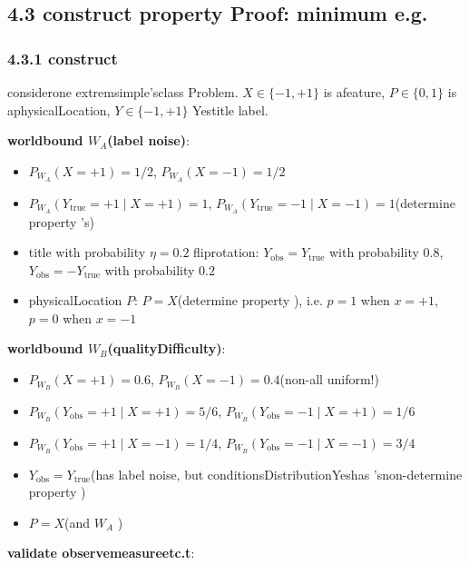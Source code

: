 \documentclass[
  12pt,
]{article}
\providecommand{\tightlist}{%
  \setlength{\itemsep}{0pt}\setlength{\parskip}{0pt}}
\begin{document}
\subsection{4.3
construct property Proof: minimum e.g.}\label{ux6784ux9020ux6027ux8bc1ux660eux6700ux5c0fux793aux4f8b}

\subsubsection{4.3.1 construct }\label{ux6784ux9020}

 considerone extremsimple'sclass Problem.  \(X \in \{-1, +1\}\)
is afeature, \(P \in \{0, 1\}\)
is aphysicalLocation, \(Y \in \{-1, +1\}\) Yestitle label. 

\textbf{worldbound  \(W_A\)(label noise)}: 

\begin{itemize}
\tightlist
\item
  \(P_{W_A}(X = +1) = 1/2\), \(P_{W_A}(X = -1) = 1/2\)
\item
  \(P_{W_A}(Y_{\text{true}} = +1 \mid X = +1) = 1\),
  \(P_{W_A}(Y_{\text{true}} = -1 \mid X = -1) = 1\)(determine property 's)
\item
  title with probability \(\eta = 0.2\) fliprotation: \(Y_{\text{obs}} = Y_{\text{true}}\)
  with probability \(0.8\), \(Y_{\text{obs}} = -Y_{\text{true}}\) with probability \(0.2\)
\item
  physicalLocation \(P\): \(P = X\)(determine property ), i.e. \(p = 1\) when 
  \(x = +1\), \(p = 0\) when  \(x = -1\)
\end{itemize}

\textbf{worldbound  \(W_B\)(qualityDifficulty)}: 

\begin{itemize}
\tightlist
\item
  \(P_{W_B}(X = +1) = 0.6\), \(P_{W_B}(X = -1) = 0.4\)(non-all uniform!)
\item
  \(P_{W_B}(Y_{\text{obs}} = +1 \mid X = +1) = 5/6\),
  \(P_{W_B}(Y_{\text{obs}} = -1 \mid X = +1) = 1/6\)
\item
  \(P_{W_B}(Y_{\text{obs}} = +1 \mid X = -1) = 1/4\),
  \(P_{W_B}(Y_{\text{obs}} = -1 \mid X = -1) = 3/4\)
\item
  \(Y_{\text{obs}} = Y_{\text{true}}\)(has label noise, but conditionsDistributionYeshas 'snon-determine property )
\item
  \(P = X\)(and  \(W_A\) )
\end{itemize}

\textbf{validate observemeasureetc.t}: 
\end{document}

